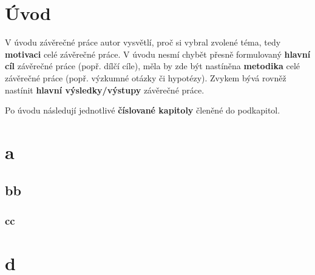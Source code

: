\documentclass[
  11pt,
  a4paper]{report}
\author{}
\date{}
\begin{document}












\chapter*{Úvod}\label{uxfavod}


V úvodu závěrečné práce autor vysvětlí, proč si vybral zvolené téma,
tedy \textbf{motivaci} celé závěrečné práce. V úvodu nesmí chybět přesně
formulovaný \textbf{hlavní cíl} závěrečné práce (popř. dílčí cíle), měla
by zde být nastíněna \textbf{metodika} celé závěrečné práce (popř.
výzkumné otázky či hypotézy). Zvykem bývá rovněž nastínit
\textbf{hlavní výsledky/výstupy} závěrečné práce.

Po úvodu následují jednotlivé \textbf{číslované kapitoly} členěné do
podkapitol.

\chapter{a}\label{a}

\section{bb}\label{bb}

\subsection{cc}\label{cc}

\chapter{d}\label{d}
\end{document}
